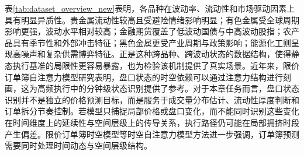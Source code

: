\begin{table}[H]
\centering
\caption{数据集概览}
\label{tab:dataset_overview_new}
\begingroup
\small
\setlength{\tabcolsep}{3.5pt}
\renewcommand{\arraystretch}{0.86}
\endgroup
\end{table}

表\ref{tab:dataset_overview_new}表明，各品种在波动率、流动性和市场驱动因素上具有明显异质性。贵金属流动性较高且受避险情绪影响明显；有色金属受全球周期影响更强，波动水平相对较高；金融期货覆盖了低波动国债与中高波动股指；农产品具有季节性和外部冲击特征；黑色金属更受产业周期与政策影响；能源化工则呈现高噪声和复杂供需博弈特征。正是这种跨品种、跨波动状态的数据结构，使得静态执行基准的局限性更容易暴露，也为检验该机制提供了真实场景。近年来，限价订单簿自注意力模型研究表明，盘口状态的时空依赖可以通过注意力结构进行刻画，这为高频执行中的分钟级状态识别提供了参考\cite{xiao2025lit}。对于本章任务而言，盘口状态识别并不是独立的价格预测目标，而是服务于成交量分布估计、流动性厚度判断和订单拆分节奏控制。若模型只捕捉局部价格或盘口变化，而不能同时识别这些变化在时间维度上的延续性与空间层级上的传导关系，执行路径仍可能在局部拥挤时段产生偏差。限价订单簿时空模型等时空自注意力模型方法进一步强调，订单簿预测需要同时处理时间动态与空间层级结构\cite{berti2025tlob}。

